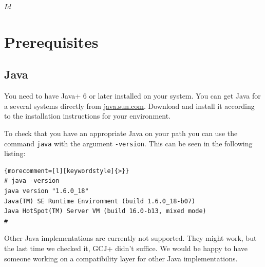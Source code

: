 \SVN$Id$
\chapter{Prerequisites}

\section{Java}

You need to have \+Java+ 6 or later installed on your system. You can
get Java for a several systems directly from \url{java.sun.com}.
Download and install it according to the installation instructions for
your environment.

To check that you have an appropriate Java on your path you can use
the command \texttt{java} with the argument \texttt{-version}. This
can be seen in the following listing:

%
\begin{lstlisting}{morecomment=[l][keywordstyle]{>}}
# java -version
java version "1.6.0_18"
Java(TM) SE Runtime Environment (build 1.6.0_18-b07)
Java HotSpot(TM) Server VM (build 16.0-b13, mixed mode)
#
\end{lstlisting}

Other Java implementations are currently not supported. They might
work, but the last time we checked it, \+GCJ+ didn't suffice. We would
be happy to have someone working on a compatibility layer for other
Java implementations.


